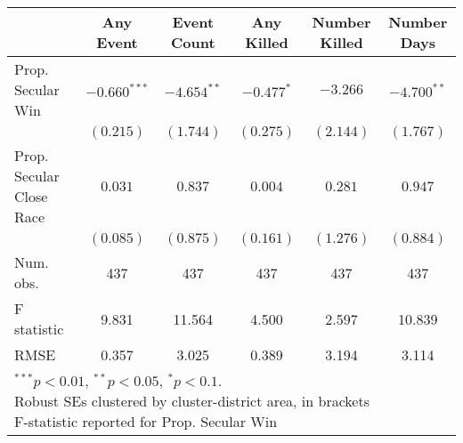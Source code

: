 
\begin{tabular}{l c c c c c }
\hline
 & Any Event & Event Count & Any Killed & Number Killed & Number Days \\
\hline
Prop. Secular Win        & $-0.660^{***}$ & $-4.654^{**}$ & $-0.477^{*}$ & $-3.266$  & $-4.700^{**}$ \\
                         & $(0.215)$      & $(1.744)$     & $(0.275)$    & $(2.144)$ & $(1.767)$     \\
Prop. Secular Close Race & $0.031$        & $0.837$       & $0.004$      & $0.281$   & $0.947$       \\
                         & $(0.085)$      & $(0.875)$     & $(0.161)$    & $(1.276)$ & $(0.884)$     \\
\hline
Num. obs.                & 437            & 437           & 437          & 437       & 437           \\
F statistic              & 9.831          & 11.564        & 4.500        & 2.597     & 10.839        \\
RMSE                     & 0.357          & 3.025         & 0.389        & 3.194     & 3.114         \\
\hline
\multicolumn{6}{l}{\scriptsize{\parbox{.4\linewidth}{\vspace{2pt}$^{***}p<0.01$, $^{**}p<0.05$, $^*p<0.1$. \\
       Robust SEs clustered by cluster-district area, in brackets\\ F-statistic reported for Prop. Secular Win}}}
\end{tabular}
